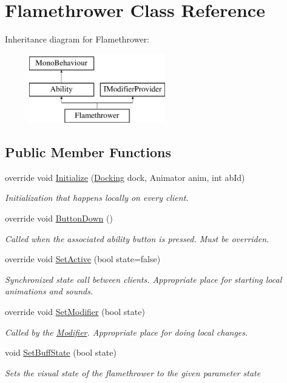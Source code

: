 \hypertarget{class_flamethrower}{}\section{Flamethrower Class Reference}
\label{class_flamethrower}
Inheritance diagram for Flamethrower\+:\begin{figure}[H]
\begin{center}
\leavevmode
\includegraphics[height=3.000000cm]{class_flamethrower}
\end{center}
\end{figure}
\subsection*{Public Member Functions}
\begin{DoxyCompactItemize}
\item 
override void \hyperlink{class_flamethrower_a825b0e637ff46bd9b75c9d4705d194de}{Initialize} (\hyperlink{class_docking}{Docking} dock, Animator anim, int ab\+Id)
\begin{DoxyCompactList}\small\item\em Initialization that happens locally on every client. \end{DoxyCompactList}\item 
override void \hyperlink{class_flamethrower_ad41102fce610be1bae9c795f4d720df5}{Button\+Down} ()
\begin{DoxyCompactList}\small\item\em Called when the associated ability button is pressed. Must be overriden. \end{DoxyCompactList}\item 
override void \hyperlink{class_flamethrower_acda546d1011d10da7b0574726a2408fe}{Set\+Active} (bool state=false)
\begin{DoxyCompactList}\small\item\em Synchronized state call between clients. Appropriate place for starting local animations and sounds. \end{DoxyCompactList}\item 
override void \hyperlink{class_flamethrower_a839995136fda8bb0ea556f3a1443253b}{Set\+Modifier} (bool state)
\begin{DoxyCompactList}\small\item\em Called by the \hyperlink{class_modifier}{Modifier}. Appropriate place for doing local changes. \end{DoxyCompactList}\item 
void \hyperlink{class_flamethrower_a5cdec1a136398627fb280f251834ff54}{Set\+Buff\+State} (bool state)
\begin{DoxyCompactList}\small\item\em Sets the visual state of the flamethrower to the given parameter state \end{DoxyCompactList}\end{DoxyCompactItemize}
